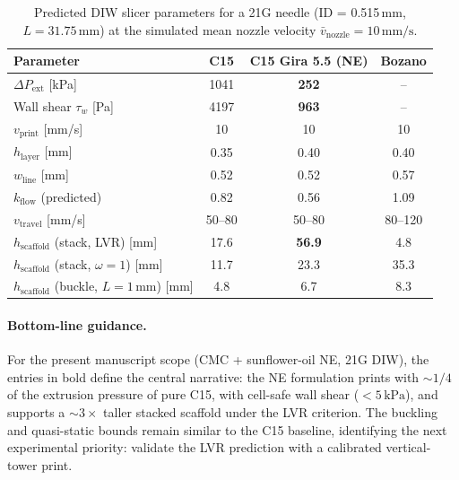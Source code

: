 \documentclass[11pt,a4paper]{article}
\newcommand{\mms}{\,\mathrm{mm/s}}
\begin{document}
\begin{table}[h]
\centering
\small
\caption{Predicted DIW slicer parameters for a 21G needle (ID = 0.515\,mm,
$L = 31.75\,\mathrm{mm}$) at the simulated mean nozzle velocity
$\bar v_\mathrm{nozzle}=10\mms$.}
\label{tab:slicer_predicted}
\begin{tabular}{l c c c}
\toprule
Parameter & C15 & C15 Gira 5.5 (NE) & Bozano \\
\midrule
$\Delta P_\mathrm{ext}$ [kPa]            & 1041   & \textbf{252}    & --       \\
Wall shear $\tau_w$ [Pa]                  & 4197   & \textbf{963}    & --       \\
$v_\mathrm{print}$ [mm/s]                 & 10     & 10              & 10        \\
$h_\mathrm{layer}$ [mm]                   & 0.35   & 0.40            & 0.40     \\
$w_\mathrm{line}$ [mm]                    & 0.52   & 0.52            & 0.57     \\
$k_\mathrm{flow}$ (predicted)             & 0.82   & 0.56            & 1.09     \\
$v_\mathrm{travel}$ [mm/s]                & 50--80 & 50--80          & 80--120  \\
$h_\mathrm{scaffold}$ (stack, LVR) [mm]   & 17.6   & \textbf{56.9}   & 4.8      \\
$h_\mathrm{scaffold}$ (stack, $\omega=1$) [mm] & 11.7 & 23.3 & 35.3 \\
$h_\mathrm{scaffold}$ (buckle, $L=1$\,mm) [mm] & 4.8 & 6.7 & 8.3 \\
\bottomrule
\end{tabular}
\end{table}

\paragraph{Bottom-line guidance.}
For the present manuscript scope (CMC + sunflower-oil NE, 21G DIW), the entries
in bold define the central narrative: the NE formulation prints with
$\sim\!1/4$ of the extrusion pressure of pure C15, with cell-safe wall shear
($<5\,\mathrm{kPa}$), and supports a $\sim\!3\times$ taller stacked scaffold
under the LVR criterion. The buckling and quasi-static bounds remain similar to
the C15 baseline, identifying the next experimental priority: validate the LVR
prediction with a calibrated vertical-tower print.

\end{document}

